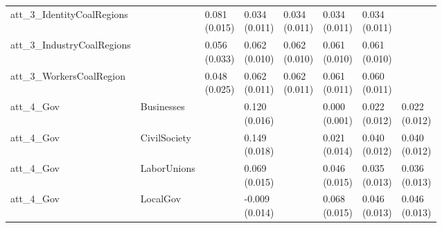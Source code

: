 \begin{tabular}{lllllll}
att_3_IdentityCoalRegions &   & \makecell{ 0.081 \\ (0.015) } & \makecell{ 0.034 \\ (0.011) } & \makecell{ 0.034 \\ (0.011) } & \makecell{ 0.034 \\ (0.011) } & \makecell{ 0.034 \\ (0.011) } \\
att_3_IndustryCoalRegions &   & \makecell{ 0.056 \\ (0.033) } & \makecell{ 0.062 \\ (0.010) } & \makecell{ 0.062 \\ (0.010) } & \makecell{ 0.061 \\ (0.010) } & \makecell{ 0.061 \\ (0.010) } \\
att_3_WorkersCoalRegion &   & \makecell{ 0.048 \\ (0.025) } & \makecell{ 0.062 \\ (0.011) } & \makecell{ 0.062 \\ (0.011) } & \makecell{ 0.061 \\ (0.011) } & \makecell{ 0.060 \\ (0.011) } \\
att_4_Gov&Businesses &   & \makecell{ 0.120 \\ (0.016) } &   & \makecell{ 0.000 \\ (0.001) } & \makecell{ 0.022 \\ (0.012) } & \makecell{ 0.022 \\ (0.012) } \\
att_4_Gov&CivilSociety &   & \makecell{ 0.149 \\ (0.018) } &   & \makecell{ 0.021 \\ (0.014) } & \makecell{ 0.040 \\ (0.012) } & \makecell{ 0.040 \\ (0.012) } \\
att_4_Gov&LaborUnions &   & \makecell{ 0.069 \\ (0.015) } &   & \makecell{ 0.046 \\ (0.015) } & \makecell{ 0.035 \\ (0.013) } & \makecell{ 0.036 \\ (0.013) } \\
att_4_Gov&LocalGov &   & \makecell{ -0.009 \\ (0.014) } &   & \makecell{ 0.068 \\ (0.015) } & \makecell{ 0.046 \\ (0.013) } & \makecell{ 0.046 \\ (0.013) } \\

\end{tabular}
